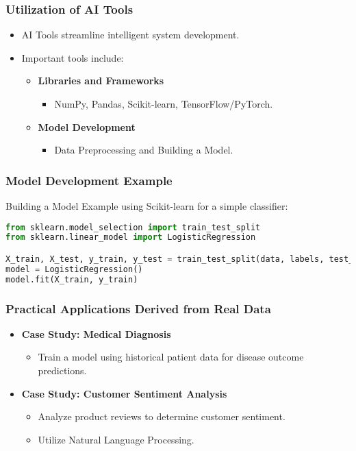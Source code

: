 \documentclass[aspectratio=169]{beamer}
\begin{document}
\begin{frame}
    \frametitle{Utilization of AI Tools}
    \begin{itemize}
        \item AI Tools streamline intelligent system development.
        \item Important tools include:
        \begin{itemize}
            \item \textbf{Libraries and Frameworks}
            \begin{itemize}
                \item NumPy, Pandas, Scikit-learn, TensorFlow/PyTorch.
            \end{itemize}

            \item \textbf{Model Development}
            \begin{itemize}
                \item Data Preprocessing and Building a Model.
            \end{itemize}
        \end{itemize}
    \end{itemize}
\end{frame}

\begin{frame}[fragile]
    \frametitle{Model Development Example}
    \begin{block}{Building a Model}
        Example using Scikit-learn for a simple classifier:
        \begin{lstlisting}[language=Python]
from sklearn.model_selection import train_test_split
from sklearn.linear_model import LogisticRegression

X_train, X_test, y_train, y_test = train_test_split(data, labels, test_size=0.2)
model = LogisticRegression()
model.fit(X_train, y_train)
        \end{lstlisting}
    \end{block}
\end{frame}

\begin{frame}
    \frametitle{Practical Applications Derived from Real Data}
    \begin{itemize}
        \item \textbf{Case Study: Medical Diagnosis}
        \begin{itemize}
            \item Train a model using historical patient data for disease outcome predictions.
        \end{itemize}

        \item \textbf{Case Study: Customer Sentiment Analysis}
        \begin{itemize}
            \item Analyze product reviews to determine customer sentiment.
            \item Utilize Natural Language Processing.
        \end{itemize}
    \end{itemize}
\end{frame}
\end{document}
